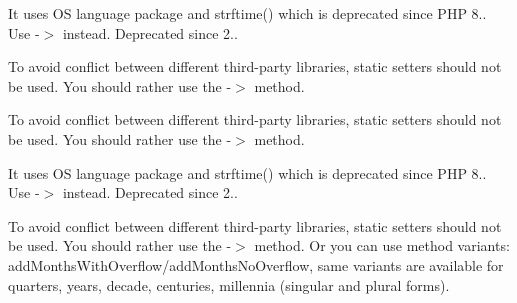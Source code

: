 \begin{DoxyRefList}
%
It uses OS language package and strftime() which is deprecated since PHP 8.. Use -\/\texorpdfstring{$>$}{>} instead. Deprecated since 2.. 
\item[Global \doxylink{interface_carbon_1_1_carbon_interface_abb57215b0f09093971f6c7b61d055527}{Carbon\+Interface\+::disable\+Human\+Diff\+Option} (\$human\+Diff\+Option)]\label{deprecated__deprecated000106}%
%
To avoid conflict between different third-\/party libraries, static setters should not be used. You should rather use the -\/\texorpdfstring{$>$}{>} method.  
\item[Global \doxylink{interface_carbon_1_1_carbon_interface_ae461a262406f6950465888b2c4e18787}{Carbon\+Interface\+::enable\+Human\+Diff\+Option} (\$human\+Diff\+Option)]\label{deprecated__deprecated000107}%
%
To avoid conflict between different third-\/party libraries, static setters should not be used. You should rather use the -\/\texorpdfstring{$>$}{>} method.  
\item[Global \doxylink{interface_carbon_1_1_carbon_interface_a071e711055126836a1291dc23f555d82}{Carbon\+Interface\+::format\+Localized} (\$format)]\label{deprecated__deprecated000108}%
%
It uses OS language package and strftime() which is deprecated since PHP 8.. Use -\/\texorpdfstring{$>$}{>} instead. Deprecated since 2.. 
\item[Global \doxylink{interface_carbon_1_1_carbon_interface_a2b0d16bf4bc86d63d7e68f605398fdab}{Carbon\+Interface\+::reset\+Months\+Overflow} ()]\label{deprecated__deprecated000109}%
%
To avoid conflict between different third-\/party libraries, static setters should not be used. You should rather use the -\/\texorpdfstring{$>$}{>} method. Or you can use method variants\+: add\+Months\+With\+Overflow/add\+Months\+No\+Overflow, same variants are available for quarters, years, decade, centuries, millennia (singular and plural forms).  

\end{DoxyRefList}
